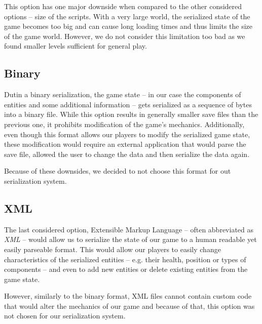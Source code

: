 This option has one major downside when compared to the other considered options -- size of the scripts. With a very large world,
the serialized state of the game becomes too big and can cause long loading times and thus limits the size of the game world.
However, we do not consider this limitation too bad as we found smaller levels sufficient for general play.

\subsection{Binary}

Dutin a binary serialization, the game state -- in our case the components of entities and some additional information -- gets
serialized as a sequence of bytes into a binary file. While this option results in generally smaller save files than the previous
one, it prohibits modification of the game's mechanics. Additionally, even though this format allows our players to modify the
serialized game state, these modification would require an external application that would parse the save file, allowed the user
to change the data and then serialize the data again.

Because of these downsides, we decided to not choose this format for out serialization system.

\subsection{XML}

The last considered option, Extensible Markup Language -- often abbreviated as \emph{XML} -- would allow us to serialize the
state of our game to a human readable yet easily parseable format. This would allow our players to easily change characteristics of the
serialized entities -- e.g. their health, position or types of components -- and even to add new entities or delete existing entities
from the game state.

However, similarly to the binary format, XML files cannot contain custom code that would alter the mechanics of our game and because
of that, this option was not chosen for our serialization system.
